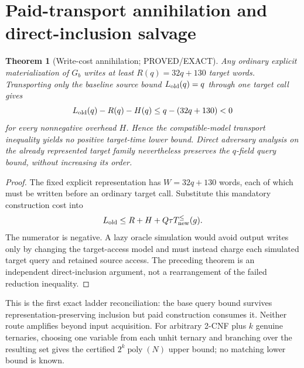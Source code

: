 \documentclass[11pt]{article}
\newtheorem{theorem}{Theorem}
\begin{document}
\section{Paid-transport annihilation and direct-inclusion salvage}
\begin{theorem}[Write-cost annihilation; PROVED/EXACT]
Any ordinary explicit materialization of $G_b$ writes at least $R(q)=32q+130$ target words.  Transporting only the baseline source bound $L_{\rm old}(q)=q$ through one target call gives
\[
L_{\rm old}(q)-R(q)-H(q)
\le q-(32q+130)<0
\]
for every nonnegative overhead $H$.  Hence the compatible-model transport inequality yields no positive target-time lower bound.  Direct adversary analysis on the already represented target family nevertheless preserves the $q$-field query bound, without increasing its order.
\end{theorem}
\begin{proof}
The fixed explicit representation has $W=32q+130$ words, each of which must be written before an ordinary target call.  Substitute this mandatory construction cost into
\[
L_{\rm old}\le R+H+Q\tau T_{\rm new}^{\le}(g).
\]
The numerator is negative.  A lazy oracle simulation would avoid output writes only by changing the target-access model and must instead charge each simulated target query and retained source access.  The preceding theorem is an independent direct-inclusion argument, not a rearrangement of the failed reduction inequality.
\end{proof}

This is the first exact ladder reconciliation: the base query bound survives representation-preserving inclusion but paid construction consumes it.  Neither route amplifies beyond input acquisition.  For arbitrary 2-CNF plus $k$ genuine ternaries, choosing one variable from each unhit ternary and branching over the resulting set gives the certified $2^k\operatorname{poly}(N)$ upper bound; no matching lower bound is known.
\end{document}
